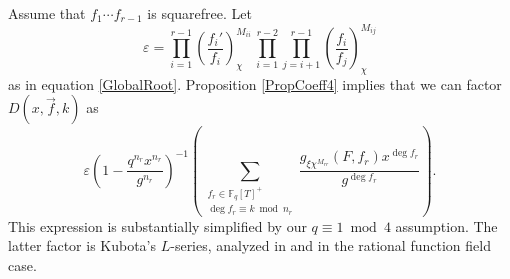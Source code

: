 \documentclass[11pt,letterpaper]{article}
\theoremstyle{definition}
\theoremstyle{remark}
\numberwithin{equation}{section}
\theoremstyle{dotless}
\newcommand{\F}{\mathbb{F}}
\newcommand{\res}[2]{\left(\frac{#1}{#2}\right)}
\begin{document}
Assume that $f_1\cdots f_{r-1}$ is squarefree. Let
\begin{equation*}
\varepsilon= \prod_{i=1}^{r-1} \res{f_i'}{f_i}_{\chi}^{M_{ii}} \, \prod_{i=1}^{r-2}\prod_{j=i+1}^{r-1} \res{f_i}{f_j}_{\chi}^{M_{ij}}
\end{equation*}
as in equation \eqref{GlobalRoot}. Proposition \ref{PropCoeff4} implies that we can factor $D(x, \vec{f}, k)$ as 
\begin{equation}\label{GlobalKubotaD}
\varepsilon \left( 1-\frac{q^{n_r} x^{n_r}}{g^{n_r}} \right)^{-1}\left( \sum_{\substack{f_r \in \F_q[T]^+ \\ \deg f_r \equiv k \bmod n_r}}  \frac{g_{\xi \chi^{M_{rr}}}(F, f_r) x^{\deg f_r} }{g^{\deg f_r}} \right).
\end{equation}
This expression is substantially simplified by our $q \equiv 1 \bmod 4$ assumption. The latter factor is Kubota's $L$-series, analyzed in \cite{Hoffstein} and \cite{Patterson} in the rational function field case. 
\end{document}
